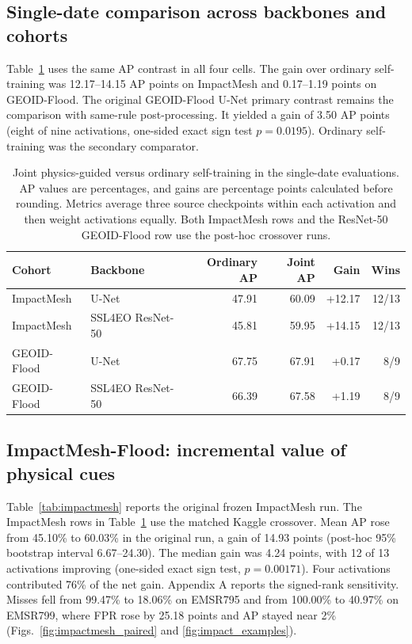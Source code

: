 \subsection{Single-date comparison across backbones and cohorts}
Table~\ref{tab:backbone_cohort} uses the same AP contrast in all four cells. The gain over ordinary self-training was 12.17--14.15 AP points on ImpactMesh and 0.17--1.19 points on GEOID-Flood. The original GEOID-Flood U-Net primary contrast remains the comparison with same-rule post-processing. It yielded a gain of 3.50 AP points (eight of nine activations, one-sided exact sign test $p=0.0195$). Ordinary self-training was the secondary comparator.

\begin{table}[pos=t]
\centering
\caption{Joint physics-guided versus ordinary self-training in the single-date evaluations. AP values are percentages, and gains are percentage points calculated before rounding. Metrics average three source checkpoints within each activation and then weight activations equally. Both ImpactMesh rows and the ResNet-50 GEOID-Flood row use the post-hoc crossover runs.}
\label{tab:backbone_cohort}
\begin{tabular}{@{}llrrrr@{}}
\toprule
Cohort & Backbone & Ordinary AP & Joint AP & Gain & Wins \\
\midrule
ImpactMesh & U-Net & 47.91 & 60.09 & +12.17 & 12/13 \\
ImpactMesh & SSL4EO ResNet-50 & 45.81 & 59.95 & +14.15 & 12/13 \\
GEOID-Flood & U-Net & 67.75 & 67.91 & +0.17 & 8/9 \\
GEOID-Flood & SSL4EO ResNet-50 & 66.39 & 67.58 & +1.19 & 8/9 \\
\bottomrule
\end{tabular}
\end{table}

\subsection{ImpactMesh-Flood: incremental value of physical cues}
\label{sec:external}

Table~\ref{tab:impactmesh} reports the original frozen ImpactMesh run. The ImpactMesh rows in Table~\ref{tab:backbone_cohort} use the matched Kaggle crossover. Mean AP rose from 45.10\% to 60.03\% in the original run, a gain of 14.93 points (post-hoc 95\% bootstrap interval 6.67--24.30). The median gain was 4.24 points, with 12 of 13 activations improving (one-sided exact sign test, $p=0.00171$). Four activations contributed 76\% of the net gain. Appendix A reports the signed-rank sensitivity. Misses fell from 99.47\% to 18.06\% on EMSR795 and from 100.00\% to 40.97\% on EMSR799, where FPR rose by 25.18 points and AP stayed near 2\% (Figs.~\ref{fig:impactmesh_paired} and \ref{fig:impact_examples}).

